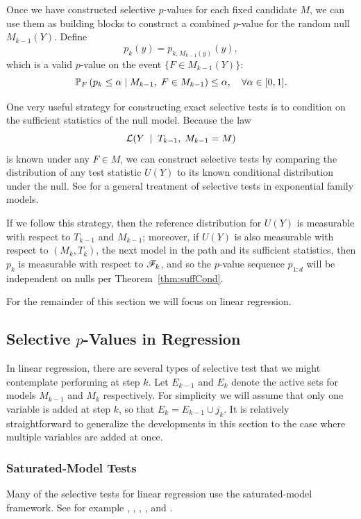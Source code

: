 \documentclass{article}
\begin{document}
Once we have constructed selective $p$-values for each fixed candidate $M$, we can use them as building blocks to construct a combined $p$-value for the random null $M_{k-1}(Y)$. Define
\[
p_k(y) = p_{k, M_{k-1}(y)}(y),
\]
which is a valid $p$-value on the event $\{F \in M_{k-1}(Y)\}$:
\begin{equation}\label{eq:selectiveGuaranteePk}
\P_F\left(p_k \leq \alpha \mid M_{k-1}, 
  \;F\in M_{k-1}\right) \leq \alpha, \quad \forall \alpha \in [0,1].
\end{equation}

One very useful strategy for constructing exact selective tests is to condition on the sufficient statistics of the null model. Because the law
\[
\L(Y \;\mid\; T_{k-1}, \; M_{k-1}=M)
\]
is known under any $F\in M$, we can construct selective tests by comparing the distribution of any test statistic $U(Y)$ to its known conditional distribution under the null. See \citet{fithian2014optimal} for a general treatment of selective tests in exponential family models.

If we follow this strategy, then the reference distribution for $U(Y)$ is measurable with respect to $T_{k-1}$ and $M_{k-1}$; moreover, if $U(Y)$ is also measurable with respect to $(M_k, T_k)$, the next model in the path and its sufficient statistics, then $p_k$ is measurable with respect to $\sF_k$, and so the $p$-value sequence $p_{1:d}$ will be independent on nulls per Theorem~\ref{thm:suffCond}.

For the remainder of this section we will focus on linear regression.

\subsection{Selective $p$-Values in Regression}
\label{sec:selective-reg}
In linear regression, there are several types of selective test that we might contemplate performing at step $k$. Let $E_{k-1}$ and $E_k$ denote the active sets for models $M_{k-1}$ and $M_k$ respectively. For simplicity we will assume that only one variable is added at step $k$, so that $E_k = E_{k-1} \cup j_k$. It is relatively straightforward to generalize the developments in this section to the case where multiple variables are added at once.

\subsubsection{Saturated-Model Tests}
Many of the selective tests for linear regression use the saturated-model framework. See for example \citet{lockhart2014significance}, \citet{taylor2013tests}, \citet{taylor2014exact}, \citet{lee2013exact}, and \citet{loftus2014significance}.
\end{document}
